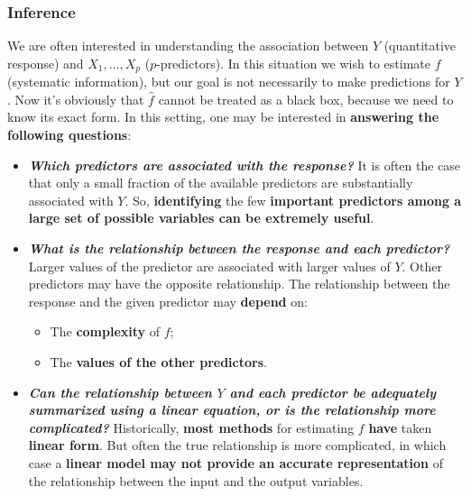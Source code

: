 \documentclass[a4paper]{article}
\newcommand{\example}[1]{\textcolor{Green4}{\textbf{#1}}}
\begin{document}
    \subsubsection{Inference}\label{subsubsection: inference}

    We are often interested in understanding the association between $Y$ (quantitative response) and $X_{1}, \dots, X_{p}$ ($p$-predictors). In this situation we wish to estimate $f$ (systematic information), but our goal is not necessarily to make predictions for $Y$. Now it's obviously that $\hat{f}$ cannot be treated as a black box, because we need to know its exact form. In this setting, one may be interested in \textbf{answering the following questions}:
    \begin{itemize}
        \item \example{\emph{Which predictors are associated with the response?}} It is often the case that only a small fraction of the available predictors are substantially associated with $Y$. So, \textbf{identifying} the few \textbf{important predictors among a large set of possible variables can be extremely useful}.

        \item \example{\emph{What is the relationship between the response and each predictor?}} Larger values of the predictor are associated with larger values of $Y$. Other predictors may have the opposite relationship. The relationship between the response and the given predictor may \textbf{depend} on:
        \begin{itemize}
            \item The \textbf{complexity} of $f$;
            \item The \textbf{values of the other predictors}.
        \end{itemize}

        \item \example{\emph{Can the relationship between $Y$ and each predictor be adequately summarized using a linear equation, or is the relationship more complicated?}} Historically, \textbf{most methods} for estimating $f$ \textbf{have} taken \textbf{linear form}. But often the true relationship is more complicated, in which case a \textbf{linear model may not provide an accurate representation} of the relationship between the input and the output variables.
    \end{itemize}
\end{document}

